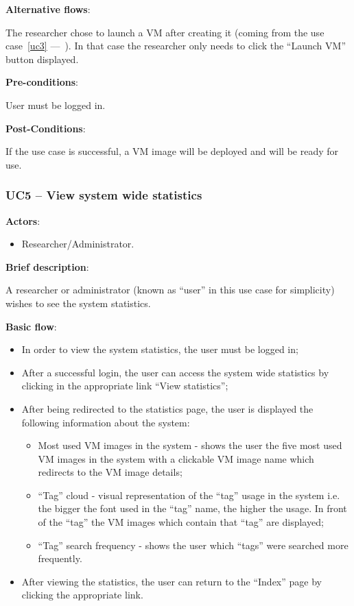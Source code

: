 \textbf{Alternative flows}:

The researcher chose to launch a VM after creating it (coming from the use case~\ref{uc3} ---~). In that case the researcher only needs to click the ``Launch VM'' button displayed.

\textbf{Pre-conditions}:

User must be logged in.

\textbf{Post-Conditions}:

If the use case is successful, a VM image will be deployed and will be ready for use.

\subsubsection{UC5 -- View system wide statistics}\label{uc5}

\textbf{Actors}:

\begin{itemize}
\item Researcher/Administrator.
\end{itemize}

\textbf{Brief description}:

A researcher or administrator (known as ``user'' in this use case for simplicity) wishes to see the system statistics.

\textbf{Basic flow}:

\begin{itemize}
\item In order to view the system statistics, the user must be logged in;
\item After a successful login, the user can access the system wide statistics by clicking in the appropriate link ``View statistics'';
\item After being redirected to the statistics page, the user is displayed the following information about the system:
	\begin{itemize}
	\item Most used VM images in the system - shows the user the five most used VM images in the system with a clickable VM image name which redirects to the VM image details;
	\item ``Tag'' cloud - visual representation of the ``tag'' usage in the system i.e. the bigger the font used in the ``tag'' name, the higher the usage. In front of the ``tag'' the VM images which contain that ``tag'' are displayed;
	\item ``Tag'' search frequency - shows the user which ``tags'' were searched more frequently.
	\end{itemize}
\item After viewing the statistics, the user can return to the ``Index'' page by clicking the appropriate link.
\end{itemize}

